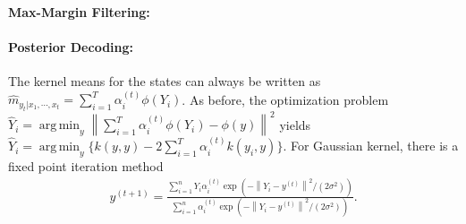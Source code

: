 \documentclass[a4paper]{article}
\newcommand{\norm}[1]{\left\lVert#1\right\rVert}
\DeclareMathOperator*{\argmin}{arg\,min}
\begin{document}
\paragraph{Max-Margin Filtering:} 
\paragraph{Posterior Decoding:} The kernel means for the states can always be written as $\hat{m}_{y_t|x_1,\cdots,x_t} = \sum_{i=1}^T \alpha_i^{(t)}\phi(Y_i)$. As before, the optimization problem $\hat{Y}_i = \argmin_{y}\norm{\sum_{i=1}^T \alpha_i^{(t)}\phi(Y_i) - \phi(y)}^2$ yields $\hat{Y}_i = \argmin_y \{ k(y,y) - 2\sum_{i=1}^T \alpha_i^{(t)}k(y_i,y)\}$. For Gaussian kernel, there is a fixed point iteration method
\begin{align}
y^{(t+1)} = \frac{\sum_{i=1}^n Y_i \alpha_i^{(t)}\exp(-\norm{Y_i-y^{(t)}}^2/(2\sigma^2))}{\sum_{i=1}^n \alpha_i^{(t)}\exp(-\norm{Y_i-y^{(t)}}^2/(2\sigma^2))}.
\end{align}

\end{document}
